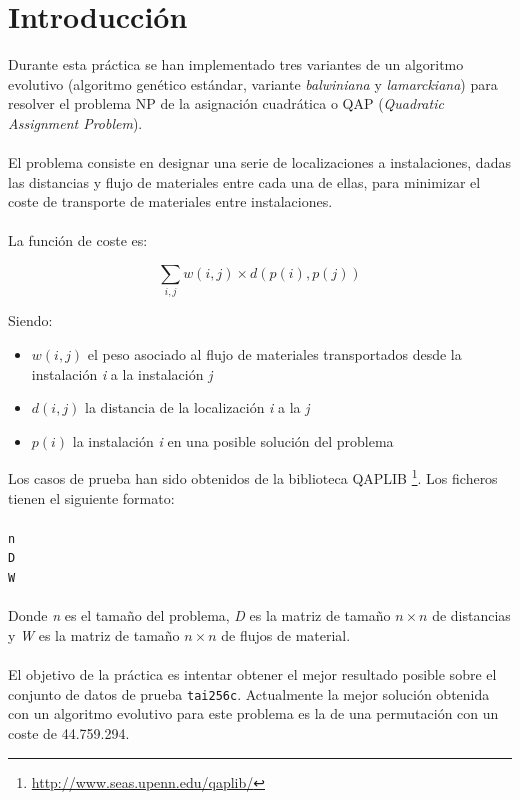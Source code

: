 \newpage %

\tableofcontents %


\newpage


\section{Introducción}

Durante esta práctica se han implementado tres variantes de un algoritmo evolutivo (algoritmo genético estándar, variante \textit{balwiniana} y \textit{lamarckiana}) para resolver el problema NP de la asignación cuadrática o QAP (\textit{Quadratic Assignment Problem}).
\\ \\
El problema consiste en designar una serie de localizaciones a instalaciones, dadas las distancias y flujo de materiales entre cada una de ellas, para minimizar el coste de transporte de materiales entre instalaciones.
\\ \\
La función de coste es:

\[ \sum_{i,j} w(i,j) \times d(p(i),p(j)) \]

Siendo:

\begin{itemize}
	\item $ w(i,j) $ el peso asociado al flujo de materiales transportados desde la instalación \textit{i} a la instalación \textit{j}
	\item $ d(i,j) $ la distancia de la localización \textit{i} a la \textit{j}
	\item $ p(i) $ la instalación \textit{i} en una posible solución del problema
\end{itemize}

Los casos de prueba han sido obtenidos de la biblioteca QAPLIB \footnote{\url{http://www.seas.upenn.edu/qaplib/}}. Los ficheros tienen el siguiente formato:
\\ \\
\texttt{n}
\\
\texttt{D}
\\
\texttt{W}
\\ \\
Donde \textit{n} es el tamaño del problema, \textit{D} es la matriz de tamaño $ n \times n $ de distancias y \textit{W} es la matriz de tamaño $ n \times n $ de flujos de material.
\\ \\
El objetivo de la práctica es intentar obtener el mejor resultado posible sobre el conjunto de datos de prueba \texttt{tai256c}. Actualmente la mejor solución obtenida con un algoritmo evolutivo para este problema es la de una permutación con un coste de 44.759.294.

